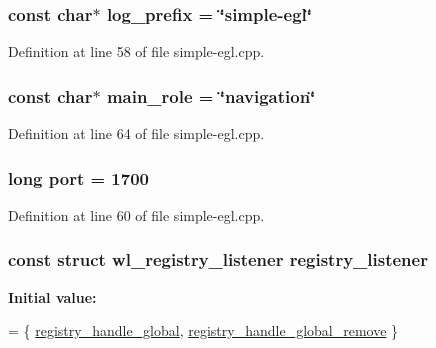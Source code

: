 \subsubsection[{\texorpdfstring{log\+\_\+prefix}{log_prefix}}]{\setlength{\rightskip}{0pt plus 5cm}const char$\ast$ log\+\_\+prefix = \char`\"{}simple-\/egl\char`\"{}}\hypertarget{simple-egl_8cpp_a894f18168fa25101d792262f59846938}{}\label{simple-egl_8cpp_a894f18168fa25101d792262f59846938}


Definition at line 58 of file simple-\/egl.\+cpp.

\subsubsection[{\texorpdfstring{main\+\_\+role}{main_role}}]{\setlength{\rightskip}{0pt plus 5cm}const char$\ast$ main\+\_\+role = \char`\"{}navigation\char`\"{}}\hypertarget{simple-egl_8cpp_a332251aa739a56836cd4fbf3ecbb8bb2}{}\label{simple-egl_8cpp_a332251aa739a56836cd4fbf3ecbb8bb2}


Definition at line 64 of file simple-\/egl.\+cpp.

\subsubsection[{\texorpdfstring{port}{port}}]{\setlength{\rightskip}{0pt plus 5cm}long port = 1700}\hypertarget{simple-egl_8cpp_a300b6806fe6818927fe4df08f2398124}{}\label{simple-egl_8cpp_a300b6806fe6818927fe4df08f2398124}


Definition at line 60 of file simple-\/egl.\+cpp.

\subsubsection[{\texorpdfstring{registry\+\_\+listener}{registry_listener}}]{\setlength{\rightskip}{0pt plus 5cm}const struct wl\+\_\+registry\+\_\+listener registry\+\_\+listener\hspace{0.3cm}{\ttfamily [static]}}\hypertarget{simple-egl_8cpp_a8998c87c94cd7d185e8f0cdafab4b1c4}{}\label{simple-egl_8cpp_a8998c87c94cd7d185e8f0cdafab4b1c4}
{\bfseries Initial value\+:}
\begin{DoxyCode}
= \{
    \hyperlink{simple-egl_8cpp_af288e02a94c196a68b327fc55c049932}{registry\_handle\_global},
    \hyperlink{simple-egl_8cpp_a59a731b9efa9d6a2015cdc8ccae1db80}{registry\_handle\_global\_remove}
\}
\end{DoxyCode}


